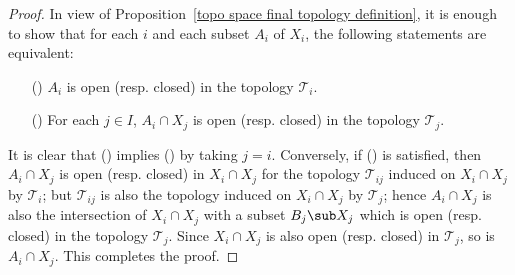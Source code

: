 \begin{proof}
In view of Proposition~\ref{topo space final topology definition}, it is enough to show that for each $i$ and each subset $A_i$ of $X_i$, the following statements are equivalent:
\begin{enumerate}
\item[(\rmnum{1})] $A_i$ is open (resp. closed) in the topology $\mathcal{T}_i$.
\item[(\rmnum{2})] For each $j\in I$, $A_i\cap X_j$ is open (resp. closed) in the topology $\mathcal{T}_j$.
\end{enumerate}
It is clear that () implies () by taking $j=i$. Conversely, if () is satisfied, then $A_i\cap X_j$ is open (resp. closed) in $X_i\cap X_j$ for the topology $\mathcal{T}_{ij}$ induced on $X_i\cap X_j$ by $\mathcal{T}_i$; but $\mathcal{T}_{ij}$ is also the topology induced on $X_i\cap X_j$ by $\mathcal{T}_{j}$; hence $A_i\cap X_j$ is also the intersection of $X_i\cap X_j$ with a subset $B_j\sub X_j$ which is open (resp. closed) in the topology $\mathcal{T}_j$. Since $X_i\cap X_j$ is also open (resp. closed) in $\mathcal{T}_j$, so is $A_i\cap X_j$. This completes the proof.
\end{proof}
